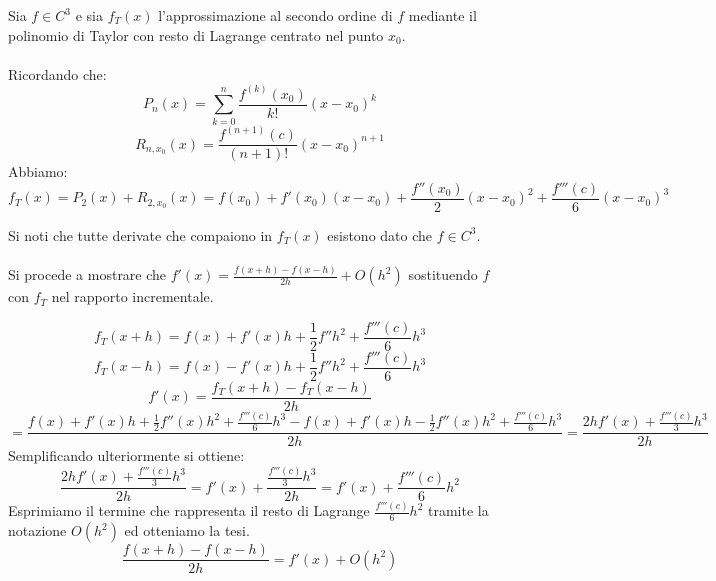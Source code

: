 \begin{center}
\footnotesize\noindent{}\end{center}

Sia \(f \in C^3\) e sia \(f_T(x)\) l'approssimazione al secondo ordine di \(f\) mediante il polinomio di Taylor con resto di Lagrange centrato nel punto \(x_0\).
\\
\\
\noindent Ricordando che:
\[
P_n(x) = \sum_{k=0}^n{ \frac{f^{(k)} (x_0)}{k!}(x-x_0)^k}
\]
\[
R_{n,x_0}(x) = \frac{f^{(n+1)}(c)}{(n+1)!}(x-x_0)^{n+1}
\]
\noindent Abbiamo:
\[
f_T(x) = P_2(x) + R_{2, x_0}(x) = f(x_0) + f'(x_0)(x-x_0) + \frac{f''(x_0)}{2}(x-x_0)^2 + \frac{f'''(c)}{6}(x-x_0)^3
\]

\noindent Si noti che tutte derivate che compaiono in \(f_T(x)\) esistono dato che \(f \in C^3\).
\\
\\
\noindent Si procede a mostrare che \(f'(x) = \frac{f(x+h)-f(x-h)}{2h} + O(h^2)\) sostituendo \(f\) con \(f_T\) nel rapporto incrementale.

\[
f_T(x + h) = f(x) + f'(x)h + \frac{1}{2} f''h^2 + \frac{f'''(c)}{6}h^3
\]
\[
f_T(x - h) = f(x) - f'(x)h + \frac{1}{2} f''h^2 + \frac{f'''(c)}{6}h^3
\]
\[
f'(x) = \frac{f_T(x + h) - f_T(x - h)}{2h}
\]
\[
= \frac{
	f(x) + f'(x)h + \frac{1}{2} f''(x)h^2 + \frac{f'''(c)}{6}h^3
	-
	f(x) + f'(x)h - \frac{1}{2} f''(x)h^2 + \frac{f'''(c)}{6}h^3
}{2h} = \frac{2hf'(x) + \frac{f'''(c)}{3}h^3}{2h}
\]
\noindent Semplificando ulteriormente si ottiene:
\[
\frac{2hf'(x) + \frac{f'''(c)}{3}h^3}{2h} = f'(x) + \frac{\frac{f'''(c)}{3}h^3}{2h}= f'(x) + \frac{f'''(c)}{6}h^2
\]
\noindent Esprimiamo il termine che rappresenta il resto di Lagrange \(\frac{f'''(c)}{6}h^2\) tramite la notazione \(O(h^2)\) ed otteniamo la tesi.
\[
\frac{f(x+h)-f(x-h)}{2h} = f'(x) + O(h^2)
\]
